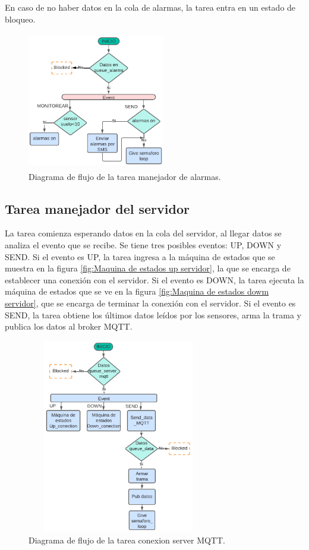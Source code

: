 En caso de no haber datos en la cola de alarmas, la tarea entra en un estado de bloqueo.


\begin{figure}[h]
  \centering
	\includegraphics[width=6cm, height=6cm]{./Figures/DF_alarms.png}
	\caption{Diagrama de flujo de la tarea manejador de alarmas.}
	\label{fig:Df tarea alarmas}
\end{figure}

\subsection{Tarea manejador del servidor } 
La tarea comienza esperando datos en la cola del servidor, al llegar datos se analiza el evento que se recibe. Se tiene tres posibles eventos: UP, DOWN y SEND. Si el evento es UP, la tarea ingresa a la máquina de estados que se muestra en la figura \ref{fig:Maquina de estados up servidor}, la que se encarga de establecer una conexión con el servidor. Si el evento es DOWN, la tarea ejecuta la máquina de estados que se ve en la figura \ref{fig:Maquina de estados dowm servidor}, que se encarga de terminar la conexión con el servidor. Si el evento es SEND, la tarea obtiene los últimos datos leídos por los sensores, arma la trama y publica los datos al broker MQTT. 
\begin{figure}[h]
  \centering
	\includegraphics[width=8cm, height=8.5cm]{./Figures/DF general task conection.png}
	\caption{Diagrama de flujo de la tarea conexion server MQTT.}
	\label{fig:Df tarea conexion}
\end{figure}

